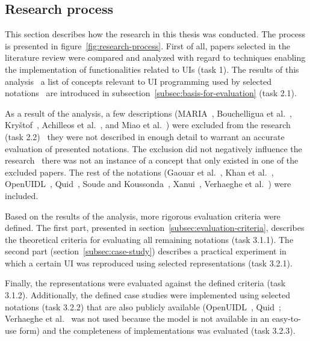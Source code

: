 \subsection{Research process}\label{subsec:research-process}

This section describes how the research in this thesis was conducted.
The process is presented in figure~\ref{fig:research-process}.
First of all, papers selected in the literature review were compared and analyzed with regard to techniques enabling the implementation of functionalities related to UIs (task 1).
The results of this analysis \textendash\ a list of concepts relevant to UI programming used by selected notations \textendash\ are introduced in subsection~\ref{subsec:basis-for-evaluation} (task 2.1).

As a result of the analysis, a few descriptions (MARIA~\cite{Paterno2009, MariaPDF}, Bouchelligua et al.~\cite{Bouchelligua2010}, Kryštof~\cite{kryvstof2010lpgm}, Achilleos et al.~\cite{Achilleos2011}, and Miao et al.~\cite{Miao2017}) were excluded from the research (task 2.2) \textendash\ they were not described in enough detail to warrant an accurate evaluation of presented notations.
The exclusion did not negatively influence the research \textendash\ there was not an instance of a concept that only existed in one of the excluded papers.
The rest of the notations (Gaouar et al.~\cite{Gaouar2018}, Khan et al.~\cite{Khan2021}, OpenUIDL~\cite{Moldovan2020}, Quid~\cite{molina2018quid, Molina2019}, Soude and Koussonda~\cite{Soude2022}, Xanui~\cite{hermida2016xanui}, Verhaeghe et al.~\cite{Verhaeghe2021visual, Verhaeghe2021behavior}) were included.

Based on the results of the analysis, more rigorous evaluation criteria were defined.
The first part, presented in section~\ref{subsec:evaluation-criteria}, describes the theoretical criteria for evaluating all remaining notations (task 3.1.1).
The second part (section~\ref{subsec:case-study}) describes a practical experiment in which a certain UI was reproduced using selected representations (task 3.2.1).

Finally, the representations were evaluated against the defined criteria (task 3.1.2).
Additionally, the defined case studies were implemented using selected notations (task 3.2.2) that are also publicly available (OpenUIDL~\cite{Moldovan2020}, Quid~\cite{molina2018quid, Molina2019}; Verhaeghe et al.~\cite{Verhaeghe2021visual, Verhaeghe2021behavior} was not used because the model is not available in an easy-to-use form) and the completeness of implementations was evaluated (task 3.2.3).

